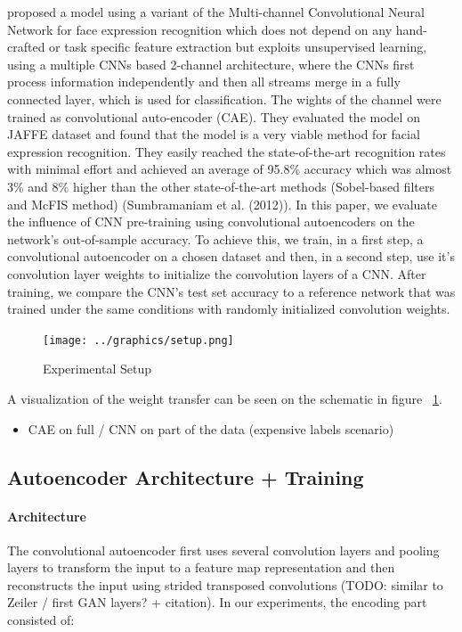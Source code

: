 \documentclass[draft]{article}
\begin{document}
\cite{hamester15} proposed a model using a variant of the Multi-channel Convolutional Neural Network for face expression recognition which does not depend on any hand-crafted or task specific feature extraction but exploits unsupervised learning, using a multiple CNNs based 2-channel architecture, where the CNNs first process information independently and then all streams merge in a fully connected layer, which is used for classification. The wights of the channel were trained as convolutional auto-encoder (CAE). They evaluated the model on JAFFE dataset and found that the model is a very viable method for facial expression recognition. They easily reached the state-of-the-art recognition rates with minimal effort and achieved an average of 95.8\% accuracy which was almost 3\% and 8\% higher than the other state-of-the-art methods (Sobel-based filters and McFIS method) (Sumbramaniam et al. (2012)).
  In this paper, we evaluate the influence of CNN pre-training using convolutional autoencoders on the network's out-of-sample accuracy. To achieve this, we train, in a first step, a convolutional autoencoder on a chosen dataset and then, in a second step, use it's convolution layer weights to initialize the convolution layers of a CNN. After training, we compare the CNN's test set accuracy to a reference network that was trained under the same conditions with randomly initialized convolution weights. 

  \begin{figure}[h]
    \centering
    \texttt{[image: ../graphics/setup.png]}
    \caption{Experimental Setup}
    \label{fig:experimental_setup}
  \end{figure}

  A visualization of the weight transfer can be seen on the schematic in figure ~\ref{fig:experimental_setup}. 

  \begin{itemize}
    \item CAE on full / CNN on part of the data (expensive labels scenario)
  \end{itemize}

  \subsection{Autoencoder Architecture + Training}

    \paragraph{Architecture}
    The convolutional autoencoder first uses several convolution layers and pooling layers to transform the input to a feature map representation and then reconstructs the input using strided transposed convolutions (TODO: similar to Zeiler / first GAN layers? + citation). In our experiments, the encoding part consisted of:
\end{document}

